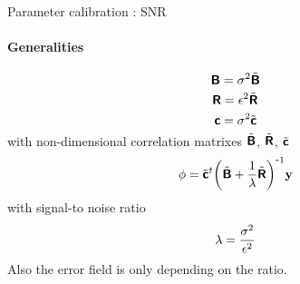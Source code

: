 
\begin{frame}{Parameter calibration : SNR}
\framesubtitle{Generalities}

\begin{equation}
\mbox{\boldmath $ \protect\mathsf{B} $}= \sigma^2 \tilde{\mbox{\boldmath $ \protect\mathsf{B} $}}
\end{equation}
\begin{equation}
\mbox{\boldmath $ \protect\mathsf{R} $}= \epsilon^2 \tilde{\mbox{\boldmath $ \protect\mathsf{R} $}}
\end{equation}
\begin{equation}
\mbox{\boldmath $ \protect\mathsf{c} $}= \sigma^2 \tilde{\mbox{\boldmath $ \protect\mathsf{c} $}}
\end{equation}
with non-dimensional correlation matrixes $\tilde{\mbox{\boldmath $ \protect\mathsf{B} $}}$, $\tilde{\mbox{\boldmath $ \protect\mathsf{R} $}}$, $\tilde{\mbox{\boldmath $ \protect\mathsf{c} $}}$
\begin{equation}
\phi= {\tilde{\matr{c}}}^t \inv{\left( \tilde{\matr{B}} + {1 \over \lambda} \tilde{\Rerr} \right)} 
\observation
\label{eq:analyzedfield}
\end{equation}
with signal-to noise ratio
\begin{equation}
\lambda= {\sigma^2 \over \epsilon^2}
\end{equation}
Also the error field is only depending on the ratio.
\end{frame}


